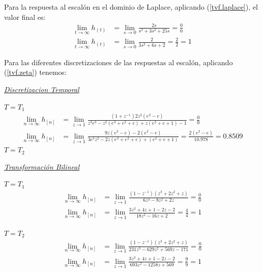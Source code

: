 \documentclass[a4paper,12pt]{report}
\begin{document}
\begin{enumerate}[label=\alph*), left=0pt]
                Para la respuesta al escalón en el dominio de Laplace, aplicando (\ref{tvf.laplace}), el valor final es:
                \begin{align*}
                    \lim_{t \to \infty} h_{(t)} &= \lim_{s \to 0} \frac{2s}{s^3 + 3s^2 + 25s} = \frac{0}{0}\\
                    \lim_{t \to \infty} h_{(t)} &= \lim_{s \to 0} \frac{2}{3s^2 + 6s + 2} = \frac{2}{2} = 1
                \end{align*}

                Para las diferentes discretizaciones de las respuestas al escalón, aplicando (\ref{tvf.zeta}) tenemos:

                {\centering\underline{\textit{Discretizacion Temporal}}\par}
                $T = T_1$
                \begin{align*}
                    \lim_{n \to \infty} h_{[n]} &= \lim_{z \to 1} \frac{(1 + z^{-1}) 2z^2 (e^2 - e)}{z^3 e^3 - z^2(e^3+e^2+e)+z(e^2+e+1)-1} = \frac{0}{0}\\
                    \lim_{n \to \infty} h_{[n]} &= \lim_{z \to 1} \frac{9z(e^2-e) - 2(e^2-e)}{3e^3z^2-2z(e^3+e^2+e)+(e^2+e+1)} = \frac{2(e^2-e)}{10.978} = 0.8509
                \end{align*}
                $T = T_2$

                {\centering\underline{\textit{Transformación Bilineal}}\par}
                $T = T_1$
                \begin{align*}
                    \lim_{n \to \infty} h_{[n]} &= \lim_{z\to{1}} \frac{(1-z^{-1})(z^3+2z^2+z)}{6z^3-8z^2+2z} = \frac{0}{0}\\
                    \lim_{n \to \infty} h_{[n]} &= \lim_{z\to{1}} \frac{3z^2+4z+1-2z-2}{18z^2-16z+2} = \frac{4}{4} = 1
                \end{align*}

                $T = T_2$
                \begin{align*}
                    \lim_{n \to \infty} h_{[n]} &= \lim_{z \to 1} \frac{(1-z^{-1})(z^3+2z^2+z)}{231z^3-629z^2+569z-171} = \frac{0}{0}\\
                    \lim_{n \to \infty} h_{[n]} &= \lim_{z \to 1} \frac{3z^2+4z+1-2z-2}{693z^2-1258z+569} = \frac{9}{9} = 1
                \end{align*}


\end{enumerate}
\end{document}
